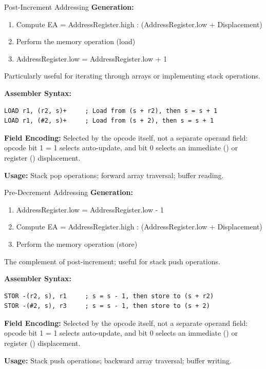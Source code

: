 \begin{addrmodebox}{Post-Increment Addressing}
	\textbf{Generation:}
	\begin{enumerate}
		\item Compute EA = AddressRegister.high : (AddressRegister.low + Displacement)
		\item Perform the memory operation (load)
		\item AddressRegister.low = AddressRegister.low + 1
	\end{enumerate}
	Particularly useful for iterating through arrays or implementing stack operations.

	\textbf{Assembler Syntax:}
	\begin{lstlisting}
LOAD r1, (r2, s)+     ; Load from (s + r2), then s = s + 1
LOAD r1, (#2, s)+     ; Load from (s + 2), then s = s + 1
	\end{lstlisting}

	\textbf{Field Encoding:} Selected by the opcode itself, not a separate operand field: opcode bit 1 = 1
	selects auto-update, and bit 0 selects an immediate () or register () displacement.

	\textbf{Usage:} Stack pop operations; forward array traversal; buffer reading.
\end{addrmodebox}

\begin{addrmodebox}{Pre-Decrement Addressing}
	\textbf{Generation:}
	\begin{enumerate}
		\item AddressRegister.low = AddressRegister.low - 1
		\item Compute EA = AddressRegister.high : (AddressRegister.low + Displacement)
		\item Perform the memory operation (store)
	\end{enumerate}
	The complement of post-increment; useful for stack push operations.

	\textbf{Assembler Syntax:}
	\begin{lstlisting}
STOR -(r2, s), r1     ; s = s - 1, then store to (s + r2)
STOR -(#2, s), r3     ; s = s - 1, then store to (s + 2)
	\end{lstlisting}

	\textbf{Field Encoding:} Selected by the opcode itself, not a separate operand field: opcode bit 1 = 1
	selects auto-update, and bit 0 selects an immediate () or register () displacement.

	\textbf{Usage:} Stack push operations; backward array traversal; buffer writing.
\end{addrmodebox}

